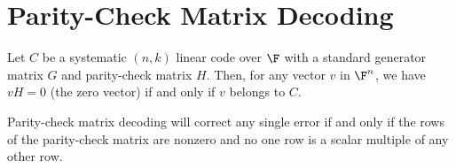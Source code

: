 \section{Parity-Check Matrix Decoding}

\begin{lemma}
	Let $C$ be a systematic $(n,k)$ linear code over $\F$ with a standard generator matrix $G$ and parity-check matrix $H$. Then, for any vector $v$ in $\F^n$, we have $vH=0$ (the zero vector) if and only if $v$ belongs to $C$.
\end{lemma}

\begin{theorem}
	Parity-check matrix decoding will correct any single error if and only if the rows of the parity-check matrix are nonzero and no one row is a scalar multiple of any other row.
\end{theorem}
